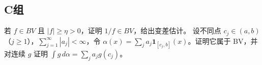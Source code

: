 \subsection*{C组}
\begin{enumerate}[label=\textbf{\thechapter.\arabic*.},resume]
若 \(f\in BV\) 且 \(|f|\ge\eta>0\)，证明 \(1/f\in BV\)，给出变差估计。
设不同点 \(c_j\in(a,b)\)（\(j\ge1\)），\(\sum_{j=1}^\infty|a_j|<\infty\)，令
\(\alpha(x)=\sum_j a_j\mathbf1_{[c_j,b]}(x)\)。证明它属于 BV，并对连续 \(g\)
证明 \(\int g\,d\alpha=\sum_j a_jg(c_j)\)。
\end{enumerate}
